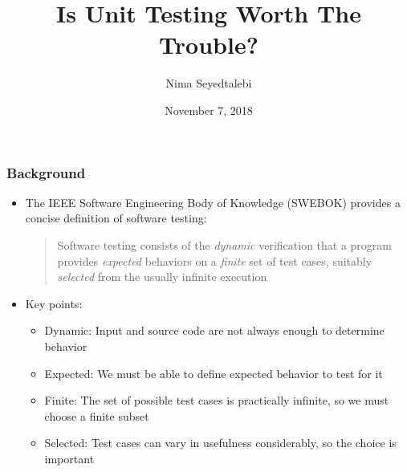 \documentclass{beamer}
\begin{document}
\author{Nima Seyedtalebi}
\title{Is Unit Testing Worth The Trouble?}
\date{November 7, 2018}

\begin{frame}[plain]
\maketitle
\end{frame}

\begin{frame}
\frametitle{Background}
\begin{itemize}
	\item The IEEE Software Engineering Body of Knowledge (SWEBOK) provides a concise definition of software testing:
	
		\blockcquote{SWEBOK}{Software testing consists of the \textit{dynamic} verification that a program provides \textit{expected} behaviors on a \textit{finite} set of test cases, suitably \textit{selected} from the usually infinite execution}
 	\item Key points:
	\begin{itemize}
 		\item Dynamic: Input and source code are not always enough to determine behavior
		\item Expected: We must be able to define expected behavior to test for it
 		\item Finite: The set of possible test cases is practically infinite, so we must choose a finite subset
 		\item Selected: Test cases can vary in usefulness considerably, so the choice is important
	\end{itemize}
\end{itemize}
\end{frame}
\end{document}

